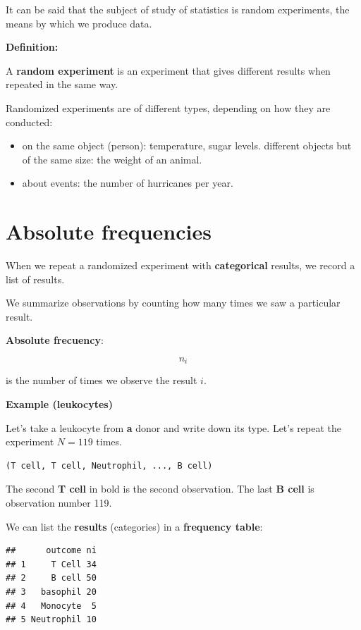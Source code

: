 \documentclass[
]{book}
\providecommand{\tightlist}{%
  \setlength{\itemsep}{0pt}\setlength{\parskip}{0pt}}
\begin{document}
It can be said that the subject of study of statistics is random experiments, the means by which we produce data.

\textbf{Definition:}

A \textbf{random experiment} is an experiment that gives different results when repeated in the same way.

Randomized experiments are of different types, depending on how they are conducted:

\begin{itemize}
\tightlist
\item
  on the same object (person): temperature, sugar levels.
  different objects but of the same size: the weight of an animal.
\item
  about events: the number of hurricanes per year.
\end{itemize}

\hypertarget{absolute-frequencies}{%
\section{Absolute frequencies}\label{absolute-frequencies}}

When we repeat a randomized experiment with \textbf{categorical} results, we record a list of results.

We summarize observations by counting how many times we saw a particular result.

\textbf{Absolute frecuency}:

\[ n_i \]

is the number of times we observe the result \(i\).

\textbf{Example (leukocytes)}

Let's take a leukocyte from \textbf{a} donor and write down its type. Let's repeat the experiment \(N=119\) times.

\begin{verbatim}
(T cell, T cell, Neutrophil, ..., B cell)
\end{verbatim}

The second \textbf{T cell} in bold is the second observation. The last \textbf{B cell} is observation number 119.

We can list the \textbf{results} (categories) in a \textbf{frequency table}:

\begin{verbatim}
##      outcome ni
## 1     T Cell 34
## 2     B cell 50
## 3   basophil 20
## 4   Monocyte  5
## 5 Neutrophil 10
\end{verbatim}
\end{document}
